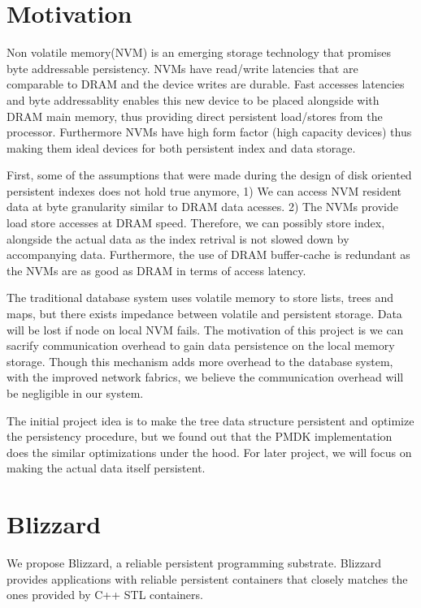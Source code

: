\section{Motivation}
Non volatile memory(NVM) is an emerging storage technology that promises byte addressable 
persistency. NVMs have read/write latencies that are comparable to DRAM and the device 
writes are durable. Fast accesses latencies and byte addressablity enables this new device
to be placed alongside with DRAM main memory, thus providing direct persistent load/stores
from the processor. Furthermore NVMs have high form factor (high capacity devices) thus
making them ideal devices for both persistent index and data storage. 


First, some of the assumptions that were made during the design of disk oriented persistent
indexes does not hold true anymore, 1) We can access NVM resident data at byte granularity similar to
DRAM data acesses. 2) The NVMs provide load store accesses at DRAM speed. Therefore, we can
possibly store index, alongside the actual data as the index retrival is not slowed down by
accompanying data. Furthermore, the use of DRAM buffer-cache is redundant as the NVMs are 
as good as DRAM in terms of access latency.


The traditional database system uses volatile memory to store lists, trees and maps, but there exists 
impedance between volatile and persistent storage. Data will be lost if node on local NVM fails. The 
motivation of this project is we can sacrify communication overhead to gain data persistence on the 
local memory storage. Though this mechanism adds more overhead to the database system, with the improved
network fabrics, we believe the communication overhead will be negligible in our system. 

The initial project idea is to make the tree data structure persistent and optimize the persistency procedure, 
but we found out that the PMDK implementation does the similar optimizations under the hood. For later 
project, we will focus on making the actual data itself persistent. 


\section{Blizzard}
We propose Blizzard, a reliable persistent programming substrate. Blizzard provides applications
with reliable persistent containers that closely matches the ones provided by C++ STL containers.

